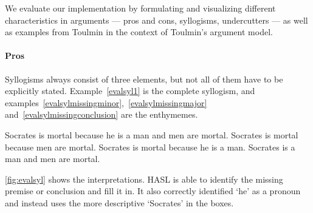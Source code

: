 We evaluate our implementation by formulating and visualizing different characteristics in arguments --- pros and cons, syllogisms, undercutters\cite{pollock1987} --- as well as examples from Toulmin\cite{toulmin1958} in the context of Toulmin's argument model.

\paragraph{Pros}
Syllogisms always consist of three elements, but not all of them have to be explicitly stated. Example~\ref{evalsyl1} is the complete syllogism, and examples~\ref{evalsylmissingminor},~\ref{evalsylmissingmajor} and~\ref{evalsylmissingconclusion} are the enthymemes.

\begin{exe}
	\ex\label{evalsyl1} Socrates is mortal because he is a man and men are mortal.
	\ex\label{evalsylmissingminor} Socrates is mortal because men are mortal.
	\ex\label{evalsylmissingmajor} Socrates is mortal because he is a man.
	\ex\label{evalsylmissingconclusion} Socrates is a man and men are mortal.
\end{exe}

\noindent \autoref{fig:evalsyl} shows the interpretations. HASL is able to identify the missing premise or conclusion and fill it in. It also correctly identified `he' as a pronoun and instead uses the more descriptive `Socrates' in the boxes.

